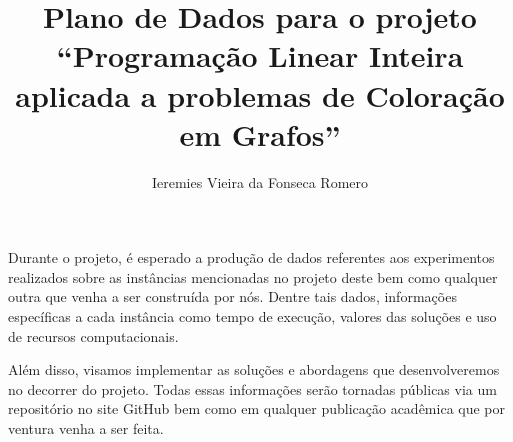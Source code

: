 \documentclass[11pt]{article}
\author{Ieremies Vieira da Fonseca Romero}
\date{}
\title{Plano de Dados para o projeto ``Programação Linear Inteira aplicada a problemas de Coloração em Grafos''}
\begin{document}
\maketitle
Durante o projeto, é esperado a produção de dados referentes aos experimentos realizados sobre as instâncias mencionadas no projeto deste \autocite{GraphColoringInstances} bem como qualquer outra que venha a ser construída por nós.
Dentre tais dados, informações específicas a cada instância como tempo de execução, valores das soluções e uso de recursos computacionais.

Além disso, visamos implementar as soluções e abordagens que desenvolveremos no decorrer do projeto.
Todas essas informações serão tornadas públicas via um repositório no site GitHub bem como em qualquer publicação acadêmica que por ventura venha a ser feita.

\printbibliography
\end{document}
